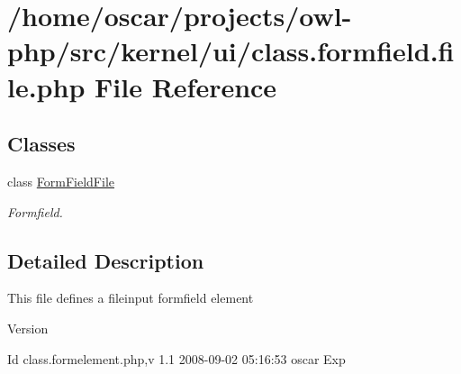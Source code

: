 \section{/home/oscar/projects/owl-\/php/src/kernel/ui/class.formfield.file.php File Reference}
\label{class_8formfield_8file_8php}
\subsection*{Classes}
\begin{DoxyCompactItemize}
\item 
class \hyperlink{classFormFieldFile}{FormFieldFile}
\begin{DoxyCompactList}\small\item\em Formfield. \item\end{DoxyCompactList}\end{DoxyCompactItemize}


\subsection{Detailed Description}
This file defines a fileinput formfield element \begin{DoxyVersion}{Version}

\end{DoxyVersion}
\begin{DoxyParagraph}{Id}
class.formelement.php,v 1.1 2008-\/09-\/02 05:16:53 oscar Exp 
\end{DoxyParagraph}
